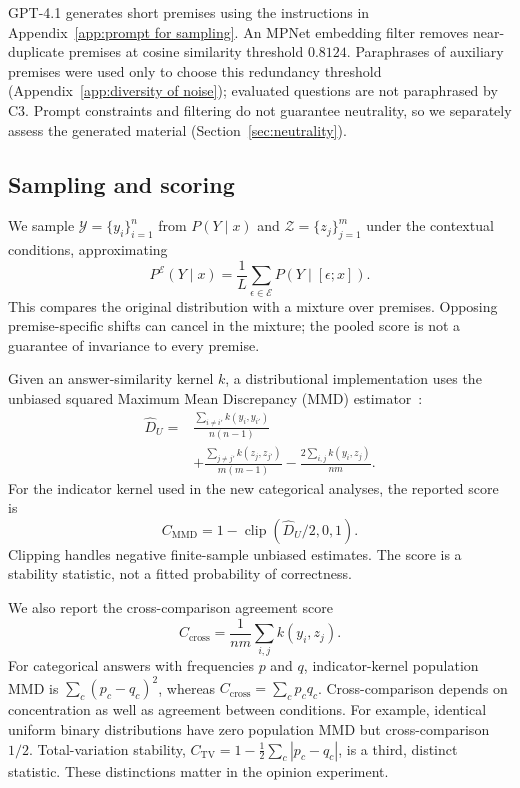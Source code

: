 \documentclass[11pt]{article}
\theoremstyle{plain}
\theoremstyle{definition}
\theoremstyle{remark}
\newif\ifrevisionmarkup
\DeclareRobustCommand{\revisioncolor}{\ifrevisionmarkup\color{red}\fi}
\newenvironment{revision}{\par\begingroup\revisioncolor}{\par\endgroup}
\begin{document}
\begin{revision}
GPT-4.1 generates short premises using the instructions in Appendix~\ref{app:prompt for sampling}. An MPNet embedding filter removes near-duplicate premises at cosine similarity threshold $0.8124$. Paraphrases of auxiliary premises were used only to choose this redundancy threshold (Appendix~\ref{app:diversity of noise}); evaluated questions are not paraphrased by C3. Prompt constraints and filtering do not guarantee neutrality, so we separately assess the generated material (Section~\ref{sec:neutrality}).

\subsection{Sampling and scoring}
We sample $\mathcal Y=\{y_i\}_{i=1}^{n}$ from $P(Y\mid x)$ and $\mathcal Z=\{z_j\}_{j=1}^{m}$ under the contextual conditions, approximating
\begin{equation}
 P^{\mathcal E}(Y\mid x)=\frac{1}{L}\sum_{\epsilon\in\mathcal E}P(Y\mid[\epsilon;x]).
\end{equation}
This compares the original distribution with a mixture over premises. Opposing premise-specific shifts can cancel in the mixture; the pooled score is not a guarantee of invariance to every premise.

Given an answer-similarity kernel $k$, a distributional implementation uses the unbiased squared Maximum Mean Discrepancy (MMD) estimator~\citep{JMLR:v13:gretton12a}:
\begin{equation}
\begin{aligned}
 \widehat D_U={}&\frac{\sum_{i\ne i'}k(y_i,y_{i'})}{n(n-1)}\\
 &+\frac{\sum_{j\ne j'}k(z_j,z_{j'})}{m(m-1)}
 -\frac{2\sum_{i,j}k(y_i,z_j)}{nm}.
\end{aligned}
\label{eq:mmd_main}
\end{equation}
For the indicator kernel used in the new categorical analyses, the reported score is
\begin{equation}
 C_{\mathrm{MMD}}=1-\operatorname{clip}(\widehat D_U/2,0,1).
\label{eq:c3_mmd}
\end{equation}
Clipping handles negative finite-sample unbiased estimates. The score is a stability statistic, not a fitted probability of correctness.

We also report the cross-comparison agreement score
\begin{equation}
 C_{\mathrm{cross}}=\frac{1}{nm}\sum_{i,j}k(y_i,z_j).
\label{eq:c3_cross}
\end{equation}
For categorical answers with frequencies $p$ and $q$, indicator-kernel population MMD is $\sum_c(p_c-q_c)^2$, whereas $C_{\mathrm{cross}}=\sum_c p_cq_c$. Cross-comparison depends on concentration as well as agreement between conditions. For example, identical uniform binary distributions have zero population MMD but cross-comparison $1/2$. Total-variation stability, $C_{\mathrm{TV}}=1-\frac12\sum_c|p_c-q_c|$, is a third, distinct statistic. These distinctions matter in the opinion experiment.


\end{revision}
\end{document}
